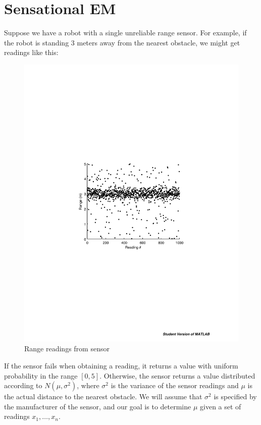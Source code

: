 \section{Sensational EM }

Suppose we have a robot with a single unreliable range sensor. For
example, if the robot is standing 3 meters away from the nearest
obstacle, we might get readings like this:
\begin{figure}[h!]
  \centering
  \includegraphics[scale=0.5]{images/range_readings}
  \caption{Range readings from sensor}
  \label{fig:range}
\end{figure}

If the sensor fails when obtaining a reading, it returns a value with
uniform probability in the range $[0,5]$. Otherwise, the sensor
returns a value distributed according to $N(\mu, \sigma^2)$, where
$\sigma^2$ is the variance of the sensor readings and $\mu$ is the
actual distance to the nearest obstacle. We will assume that
$\sigma^2$ is specified by the manufacturer of the sensor, and our
goal is to determine $\mu$ given a set of readings $x_1,\dots,x_n$.

